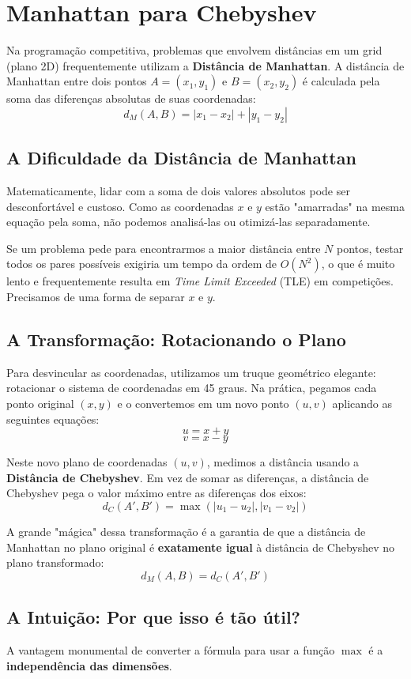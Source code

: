 \section{Manhattan para Chebyshev}

Na programação competitiva, problemas que envolvem distâncias em um grid (plano 2D) frequentemente utilizam a \textbf{Distância de Manhattan}. A distância de Manhattan entre dois pontos $A = (x_1, y_1)$ e $B = (x_2, y_2)$ é calculada pela soma das diferenças absolutas de suas coordenadas:
\[ d_M(A, B) = |x_1 - x_2| + |y_1 - y_2| \]

\subsection{A Dificuldade da Distância de Manhattan}
Matematicamente, lidar com a soma de dois valores absolutos pode ser desconfortável e custoso. Como as coordenadas $x$ e $y$ estão "amarradas" na mesma equação pela soma, não podemos analisá-las ou otimizá-las separadamente. 

Se um problema pede para encontrarmos a maior distância entre $N$ pontos, testar todos os pares possíveis exigiria um tempo da ordem de $O(N^2)$, o que é muito lento e frequentemente resulta em \textit{Time Limit Exceeded} (TLE) em competições. Precisamos de uma forma de separar $x$ e $y$.

\subsection{A Transformação: Rotacionando o Plano}
Para desvincular as coordenadas, utilizamos um truque geométrico elegante: rotacionar o sistema de coordenadas em 45 graus. Na prática, pegamos cada ponto original $(x, y)$ e o convertemos em um novo ponto $(u, v)$ aplicando as seguintes equações:
\[ u = x + y \]
\[ v = x - y \]

Neste novo plano de coordenadas $(u, v)$, medimos a distância usando a \textbf{Distância de Chebyshev}. Em vez de somar as diferenças, a distância de Chebyshev pega o valor máximo entre as diferenças dos eixos:
\[ d_C(A', B') = \max(|u_1 - u_2|, |v_1 - v_2|) \]

A grande "mágica" dessa transformação é a garantia de que a distância de Manhattan no plano original é \textbf{exatamente igual} à distância de Chebyshev no plano transformado:
\[ d_M(A, B) = d_C(A', B') \]

\subsection{A Intuição: Por que isso é tão útil?}
A vantagem monumental de converter a fórmula para usar a função $\max$ é a \textbf{independência das dimensões}. 

